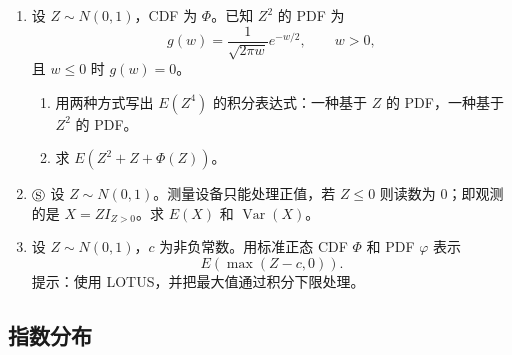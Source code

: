 \documentclass[UTF8, 12pt, fontset=fandol, oneside]{ctexart}
\begin{document}
\begin{enumerate}
  \item 设 $Z\sim N(0,1)$，CDF 为 $\Phi$。已知 $Z^2$ 的 PDF 为
  \[
    g(w)=\frac{1}{\sqrt{2\pi w}}e^{-w/2},\qquad w>0,
  \]
  且 $w\le0$ 时 $g(w)=0$。
  \begin{enumerate}
    \item 用两种方式写出 $E(Z^4)$ 的积分表达式：一种基于 $Z$ 的 PDF，一种基于 $Z^2$ 的 PDF。
    \item 求 $E(Z^2+Z+\Phi(Z))$。
  \end{enumerate}

  \item $\circledS$ 设 $Z\sim N(0,1)$。测量设备只能处理正值，若 $Z\le0$ 则读数为 $0$；即观测的是 $X=ZI_{Z>0}$。求 $E(X)$ 和 $\operatorname{Var}(X)$。

  \item 设 $Z\sim N(0,1)$，$c$ 为非负常数。用标准正态 CDF $\Phi$ 和 PDF $\varphi$ 表示
  \[
    E(\max(Z-c,0)).
  \]
  提示：使用 LOTUS，并把最大值通过积分下限处理。
\end{enumerate}

\subsection*{指数分布}
\end{document}
